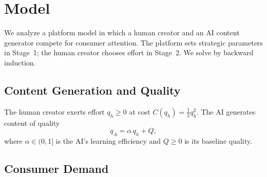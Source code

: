 \documentclass[mnsc,nonblindrev]{informs3_NoOR}
\begin{document}
\maketitle


\section{Model}\label{sec:model}
 
We analyze a platform model in which a human creator and an AI content generator compete for consumer attention. The platform sets strategic parameters in Stage~1; the human creator chooses effort in Stage~2. We solve by backward induction.
 
\subsection{Content Generation and Quality}
 
The human creator exerts effort $q_h \geq 0$ at cost $C(q_h) = \tfrac{1}{2}q_h^2$. The AI generates content of quality
\begin{equation}\label{eq:qA}
q_A = \alpha\, q_h + Q,
\end{equation}
where $\alpha \in (0,1]$ is the AI's learning efficiency and $Q \geq 0$ is its baseline quality.
 
\subsection{Consumer Demand}
 
\end{document}
